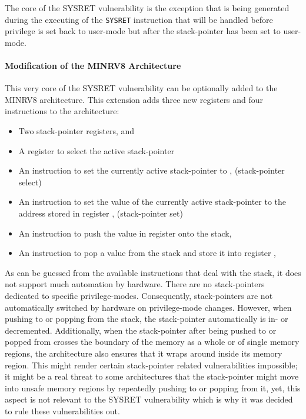 The core of the SYSRET vulnerability is the exception that is being generated during the executing of the \lstinline{SYSRET} instruction that will be handled before privilege is set back to user-mode but after the stack-pointer has been set to user-mode.

\paragraph{Modification of the MINRV8 Architecture}
This very core of the SYSRET vulnerability can be optionally added to the MINRV8 architecture.
This extension adds three new registers and four instructions to the architecture:
\begin{itemize}
    \item Two stack-pointer registers,  and 
    \item A register to select the active stack-pointer 
    \item An instruction to set the currently active stack-pointer to ,  (stack-pointer select)
    \item An instruction to set the value of the currently active stack-pointer to the address stored in register ,  (stack-pointer set)
    \item An instruction to push the value in register  onto the stack, 
    \item An instruction to pop a value from the stack and store it into register , 
\end{itemize}

As can be guessed from the available instructions that deal with the stack, it does not support much automation by hardware.
There are no stack-pointers dedicated to specific privilege-modes.
Consequently, stack-pointers are not automatically switched by hardware on privilege-mode changes.
However, when pushing to or popping from the stack, the stack-pointer automatically is in- or decremented.
Additionally, when the stack-pointer after being pushed to or popped from crosses the boundary of the memory as a whole or of single memory regions, the architecture also ensures that it wraps around inside its memory region.
This might render certain stack-pointer related vulnerabilities impossible; it might be a real threat to some architectures that the stack-pointer might move into unsafe memory regions by repeatedly pushing to or popping from it, yet, this aspect is not relevant to the SYSRET vulnerability which is why it was decided to rule these vulnerabilities out.

